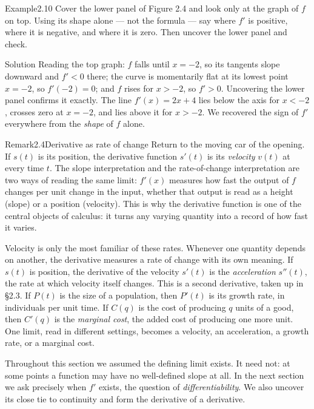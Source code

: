 \documentclass[a4paper,12pt,oneside]{memoir}
\begin{document}
\begin{workedexample}
\begin{envexample}{Example}{2.10}{}
Cover the lower panel of Figure 2.4 and look only at the graph of \(f\) on top. Using its shape alone — not the formula — say where \(f'\) is positive, where it is negative, and where it is zero. Then uncover the lower panel and check.
\end{envexample}
\begin{envsolution}{Solution}{}{}
Reading the top graph: \(f\) falls until \(x = -2\), so its tangents slope downward and \(f' < 0\) there; the curve is momentarily flat at its lowest point \(x = -2\), so \(f'(-2) = 0\); and \(f\) rises for \(x > -2\), so \(f' > 0\). Uncovering the lower panel confirms it exactly. The line \(f'(x) = 2x + 4\) lies below the axis for \(x < -2\), crosses zero at \(x = -2\), and lies above it for \(x > -2\). We recovered the sign of \(f'\) everywhere from the \emph{shape} of \(f\) alone.
\end{envsolution}
\end{workedexample}
\begin{envremark}{Remark}{2.4}{Derivative as rate of change}
Return to the moving car of the opening. If \(s(t)\) is its position, the derivative function \(s'(t)\) is its \emph{velocity} \(v(t)\) at every time \(t\). The slope interpretation and the rate-of-change interpretation are two ways of reading the same limit: \(f'(x)\) measures how fast the output of \(f\) changes per unit change in the input, whether that output is read as a height (slope) or a position (velocity). This is why the derivative function is one of the central objects of calculus: it turns any varying quantity into a record of how fast it varies.
\end{envremark}
Velocity is only the most familiar of these rates. Whenever one quantity depends on another, the derivative measures a rate of change with its own meaning. If \(s(t)\) is position, the derivative of the velocity \(s'(t)\) is the \emph{acceleration} \(s''(t)\), the rate at which velocity itself changes. This is a second derivative, taken up in §2.3. If \(P(t)\) is the size of a population, then \(P'(t)\) is its growth rate, in individuals per unit time. If \(C(q)\) is the cost of producing \(q\) units of a good, then \(C'(q)\) is the \emph{marginal cost}, the added cost of producing one more unit. One limit, read in different settings, becomes a velocity, an acceleration, a growth rate, or a marginal cost.

Throughout this section we assumed the defining limit exists. It need not: at some points a function may have no well-defined slope at all. In the next section we ask precisely when \(f'\) exists, the question of \emph{differentiability}. We also uncover its close tie to continuity and form the derivative of a derivative.
\end{document}
